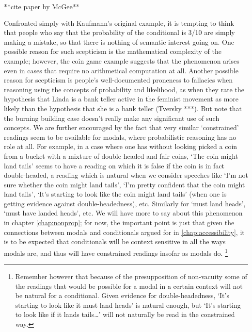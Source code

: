 \documentclass[If.tex]{subfiles}
\begin{document}
**cite paper by McGee**

Confronted simply with Kaufmann's original example, it is tempting to think that people who say that the probability of the conditional is 3/10 are simply making a mistake, so that there is nothing of semantic interest going on.  One possible reason for such scepticism is the mathematical complexity of the example; however, the coin game example suggests that the phenomenon arises even in cases that require no arithmetical computation at all.  Another possible reason for scepticism is people's well-documented proneness to fallacies when reasoning using the concepts of probability and likelihood, as when they rate the hypothesis that Linda is a bank teller active in the feminist movement as more likely than the hypothesis that she is a bank teller (Tversky ***).  But note that the burning building case doesn't really make any significant use of such concepts.  We are further encouraged by the fact that very similar ‘constrained’ readings seem to be available for modals, where probabilistic reasoning has no role at all.  For example, in a case where one has without looking picked a coin from a bucket with a mixture of double headed and fair coins, ‘The coin might land tails’ seems to have a reading on which it is false if the coin is in fact double-headed, a reading which is natural when we consider speeches like ‘I'm not sure whether the coin might land tails’, ‘I'm pretty confident that the coin might land tails’, ‘It's starting to look like the coin might land tails’ (when one is getting evidence against double-headedness), etc.  Similarly for ‘must land heads’, ‘must have landed heads’, etc.  We will have more to say about this phenomenon in chapter \ref{chap:nonprop}; for now, the important point is just that given the connections between modals and conditionals argued for in \autoref{chap:accessibility}, it is to be expected that conditionals will be context sensitive in all the ways modals are, and thus will have constrained readings insofar as modals do.%
\footnote{Remember however that because of the presupposition of non-vacuity some of the readings that would be possible for a modal in a certain context will not be natural for a conditional.  Given evidence for double-headedness, ‘It's starting to look like it must land heads’ is natural enough, but ‘It's starting to look like if it lands tails…’ will not naturally be read in the constrained way.}  
\end{document}

